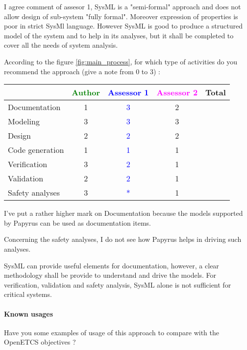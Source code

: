 \begin{assessor2}
I agree comment of assesor 1, SysML is a "semi-formal" approach and does not allow design of sub-system "fully formal". Moreover expression of properties is poor in strict SysMl language.
However SysML is good to produce a structured model of the system  and to help  in its analyses, but it shall be completed to cover all the needs of system analysis.
\end{assessor2}

According to the figure \ref{fig:main_process}, for which type of activities do you recommend the approach (give a note from 0 to 3) :

\begin{tabular}{|l | c | c | c | c|}
\hline
& \textcolor{green}{Author} & \textcolor{blue}{Assessor 1} & \textcolor{magenta}{Assessor 2} & Total \\
\hline
Documentation & 1 & \textcolor{blue}{3} & 2 & \\
\hline
Modeling & 3 &  \textcolor{blue}{3} & 3 & \\
\hline
Design & 2 &  \textcolor{blue}{2} & 2 & \\
\hline
Code generation & 1 &  \textcolor{blue}{1} & 1 & \\
\hline
Verification & 3 &  \textcolor{blue}{2} & 1 & \\
\hline
Validation & 2 &  \textcolor{blue}{2} & 1 & \\
\hline
Safety analyses & 3 & \textcolor{blue}{*} & 1 & \\
\hline
\end{tabular}

\begin{assessor1}
I've put a rather higher mark on Documentation because the models supported by Papyrus can be used as documentation items. 

Concerning the safety analyses, I do not see how Papyrus helps in driving such analyses. 
\end{assessor1}

\begin{assessor2}
SysML can provide useful elements for documentation, however, a clear methodology shall be provide to understand and drive the models. For verification, validation and safety analysis, SysML alone is not sufficient for critical systems. 
\end{assessor2}

\paragraph{Known usages} Have you some examples of usage of this approach to compare with the OpenETCS objectives ?

